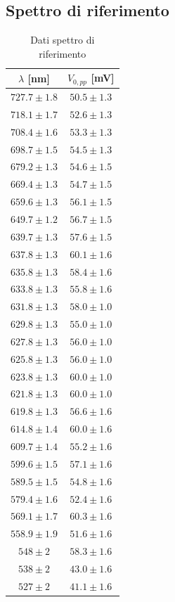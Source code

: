 \subsection{Spettro di riferimento}
\begin{table}[h]
\centering
\begin{tabular}{|c|c|}
\hline
$\lambda$ [nm] & $V_{0,pp}$ [mV] \\
\hline\hline
$727.7 \pm 1.8$ & $50.5 \pm 1.3$ \\ \hline
$718.1 \pm 1.7$ & $52.6 \pm 1.3$ \\ \hline
$708.4 \pm 1.6$ & $53.3 \pm 1.3$ \\ \hline
$698.7 \pm 1.5$ & $54.5 \pm 1.3$ \\ \hline
$679.2 \pm 1.3$ & $54.6 \pm 1.5$ \\ \hline
$669.4 \pm 1.3$ & $54.7 \pm 1.5$ \\ \hline
$659.6 \pm 1.3$ & $56.1 \pm 1.5$ \\ \hline
$649.7 \pm 1.2$ & $56.7 \pm 1.5$ \\ \hline
$639.7 \pm 1.3$ & $57.6 \pm 1.5$ \\ \hline
$637.8 \pm 1.3$ & $60.1 \pm 1.6$ \\ \hline
$635.8 \pm 1.3$ & $58.4 \pm 1.6$ \\ \hline
$633.8 \pm 1.3$ & $55.8 \pm 1.6$ \\ \hline
$631.8 \pm 1.3$ & $58.0 \pm 1.0$ \\ \hline
$629.8 \pm 1.3$ & $55.0 \pm 1.0$ \\ \hline
$627.8 \pm 1.3$ & $56.0 \pm 1.0$ \\ \hline
$625.8 \pm 1.3$ & $56.0 \pm 1.0$ \\ \hline
$623.8 \pm 1.3$ & $60.0 \pm 1.0$ \\ \hline
$621.8 \pm 1.3$ & $60.0 \pm 1.0$ \\ \hline
$619.8 \pm 1.3$ & $56.6 \pm 1.6$ \\ \hline
$614.8 \pm 1.4$ & $60.0 \pm 1.6$ \\ \hline
$609.7 \pm 1.4$ & $55.2 \pm 1.6$ \\ \hline
$599.6 \pm 1.5$ & $57.1 \pm 1.6$ \\ \hline
$589.5 \pm 1.5$ & $54.8 \pm 1.6$ \\ \hline
$579.4 \pm 1.6$ & $52.4 \pm 1.6$ \\ \hline
$569.1 \pm 1.7$ & $60.3 \pm 1.6$ \\ \hline
$558.9 \pm 1.9$ & $51.6 \pm 1.6$ \\ \hline
$548 \pm 2$ & $58.3 \pm 1.6$ \\ \hline
$538 \pm 2$ & $43.0 \pm 1.6$ \\ \hline
$527 \pm 2$ & $41.1 \pm 1.6$ \\ \hline
\end{tabular}
\caption{Dati spettro di riferimento}
\label{tab:riferimento}
\end{table}

